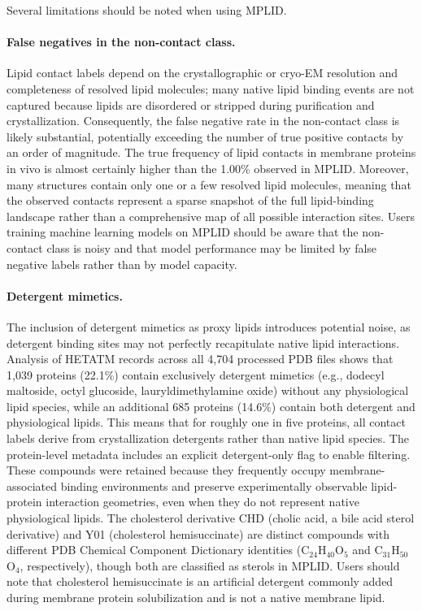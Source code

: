 \documentclass[unnumsec,webpdf,contemporary,large]{oup-authoring-template}
\begin{document}
Several limitations should be noted when using MPLID.

\paragraph{False negatives in the non-contact class.} Lipid contact labels depend on the crystallographic or cryo-EM resolution and completeness of resolved lipid molecules; many native lipid binding events are not captured because lipids are disordered or stripped during purification and crystallization. Consequently, the false negative rate in the non-contact class is likely substantial, potentially exceeding the number of true positive contacts by an order of magnitude. The true frequency of lipid contacts in membrane proteins in vivo is almost certainly higher than the 1.00\% observed in MPLID. Moreover, many structures contain only one or a few resolved lipid molecules, meaning that the observed contacts represent a sparse snapshot of the full lipid-binding landscape rather than a comprehensive map of all possible interaction sites. Users training machine learning models on MPLID should be aware that the non-contact class is noisy and that model performance may be limited by false negative labels rather than by model capacity.

\paragraph{Detergent mimetics.} The inclusion of detergent mimetics as proxy lipids introduces potential noise, as detergent binding sites may not perfectly recapitulate native lipid interactions. Analysis of HETATM records across all 4,704 processed PDB files shows that 1,039 proteins (22.1\%) contain exclusively detergent mimetics (e.g., dodecyl maltoside, octyl glucoside, lauryldimethylamine oxide) without any physiological lipid species, while an additional 685 proteins (14.6\%) contain both detergent and physiological lipids. This means that for roughly one in five proteins, all contact labels derive from crystallization detergents rather than native lipid species. The protein-level metadata includes an explicit detergent-only flag to enable filtering. These compounds were retained because they frequently occupy membrane-associated binding environments and preserve experimentally observable lipid-protein interaction geometries, even when they do not represent native physiological lipids. The cholesterol derivative CHD (cholic acid, a bile acid sterol derivative) and Y01 (cholesterol hemisuccinate) are distinct compounds with different PDB Chemical Component Dictionary identities (C$_{24}$H$_{40}$O$_5$ and C$_{31}$H$_{50}$O$_4$, respectively), though both are classified as sterols in MPLID. Users should note that cholesterol hemisuccinate is an artificial detergent commonly added during membrane protein solubilization and is not a native membrane lipid.
\end{document}
